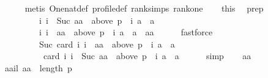 \begin{isabellebody}
\ \ \ \ \isamarkupfalse%
\ {\isacharparenleft}{\kern0pt}metis\ One{\isacharunderscore}{\kern0pt}nat{\isacharunderscore}{\kern0pt}def\ profile{\isacharunderscore}{\kern0pt}def\ rank{\isachardot}{\kern0pt}simps\ rankone{}{\isacharparenright}{\kern0pt}\isanewline
\ \ \isamarkupfalse%
\ this\ \isamarkupfalse%
\ prep{\isacharcolon}{\kern0pt}\ \isanewline
\ \ \ \ \ \ \ \ \ {\isachardoublequoteopen}{\isacharbraceleft}{\kern0pt}i{\isachardot}{\kern0pt}\ i\ {\isacharless}{\kern0pt}\ Suc\ aa\ {\isasymand}\ above\ {\isacharparenleft}{\kern0pt}p\ {\isacharbang}{\kern0pt}\ i{\isacharparenright}{\kern0pt}\ a\ {\isacharequal}{\kern0pt}\ {\isacharbraceleft}{\kern0pt}a{\isacharbraceright}{\kern0pt}{\isacharbraceright}{\kern0pt}\ \isanewline
\ \ \ \ \ \ \ \ {\isacharequal}{\kern0pt}\ {\isacharbraceleft}{\kern0pt}i{\isachardot}{\kern0pt}\ i\ {\isacharless}{\kern0pt}\ aa\ {\isasymand}\ above\ {\isacharparenleft}{\kern0pt}p\ {\isacharbang}{\kern0pt}\ i{\isacharparenright}{\kern0pt}\ a\ {\isacharequal}{\kern0pt}\ {\isacharbraceleft}{\kern0pt}a{\isacharbraceright}{\kern0pt}{\isacharbraceright}{\kern0pt}\ {\isasymunion}\ {\isacharbraceleft}{\kern0pt}aa{\isacharbraceright}{\kern0pt}{\isachardoublequoteclose}\isanewline
\ \ \ \ \isamarkupfalse%
\ fastforce\isanewline
\ \ \isamarkupfalse%
\ \isamarkupfalse%
\ \isanewline
\ \ \ \ \ \ \ \ \ {\isachardoublequoteopen}Suc\ {\isacharparenleft}{\kern0pt}card\ {\isacharbraceleft}{\kern0pt}i{\isachardot}{\kern0pt}\ i\ {\isacharless}{\kern0pt}\ aa\ {\isasymand}\ above\ {\isacharparenleft}{\kern0pt}p\ {\isacharbang}{\kern0pt}\ i{\isacharparenright}{\kern0pt}\ a\ {\isacharequal}{\kern0pt}\ {\isacharbraceleft}{\kern0pt}a{\isacharbraceright}{\kern0pt}{\isacharbraceright}{\kern0pt}{\isacharparenright}{\kern0pt}\ {\isacharequal}{\kern0pt}\isanewline
\ \ \ \ \ \ \ \ \ \ card\ {\isacharbraceleft}{\kern0pt}i{\isachardot}{\kern0pt}\ i\ {\isacharless}{\kern0pt}\ Suc\ aa\ {\isasymand}\ above\ {\isacharparenleft}{\kern0pt}p\ {\isacharbang}{\kern0pt}\ i{\isacharparenright}{\kern0pt}\ a\ {\isacharequal}{\kern0pt}\ {\isacharbraceleft}{\kern0pt}a{\isacharbraceright}{\kern0pt}{\isacharbraceright}{\kern0pt}{\isachardoublequoteclose}\isanewline
\ \ \ \ \isamarkupfalse%
\ simp\isanewline
{}\isamarkupfalse%
\isanewline
\ \ \isamarkupfalse%
\ aa\isanewline
\ \ \isamarkupfalse%
\ aail{\isacharcolon}{\kern0pt}\ {\isachardoublequoteopen}aa\ {\isacharless}{\kern0pt}\ length\ p{\isachardoublequoteclose}\isanewline

\end{isabellebody}
